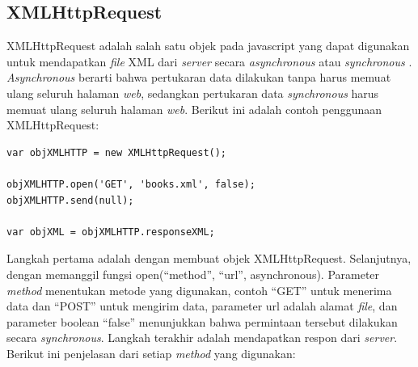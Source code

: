 \subsection{XMLHttpRequest}
XMLHttpRequest adalah salah satu objek pada javascript yang dapat digunakan
untuk mendapatkan \textit{file} XML dari \textit{server} secara \textit{asynchronous}
atau \textit{synchronous} \cite{Edmond:2006}. \textit{Asynchronous} berarti
bahwa pertukaran data dilakukan tanpa harus memuat ulang seluruh halaman \textit{web}, sedangkan 
pertukaran data \textit{synchronous} harus memuat ulang seluruh halaman
\textit{web}. Berikut ini adalah contoh penggunaan XMLHttpRequest:
\begin{verbatim}
var objXMLHTTP = new XMLHttpRequest();

objXMLHTTP.open('GET', 'books.xml', false);
objXMLHTTP.send(null);

var objXML = objXMLHTTP.responseXML;
\end{verbatim}
Langkah pertama adalah dengan membuat objek XMLHttpRequest. Selanjutnya, dengan
memanggil fungsi open(``method'', ``url'', asynchronous). Parameter
\textit{method} menentukan metode yang digunakan, contoh ``GET'' untuk menerima
data dan ``POST'' untuk mengirim data, parameter url adalah alamat
\textit{file}, dan parameter boolean ``false'' menunjukkan bahwa permintaan tersebut
dilakukan secara \textit{synchronous}. Langkah terakhir adalah mendapatkan
respon dari \textit{server}. Berikut ini penjelasan dari setiap \textit{method}
yang digunakan:
